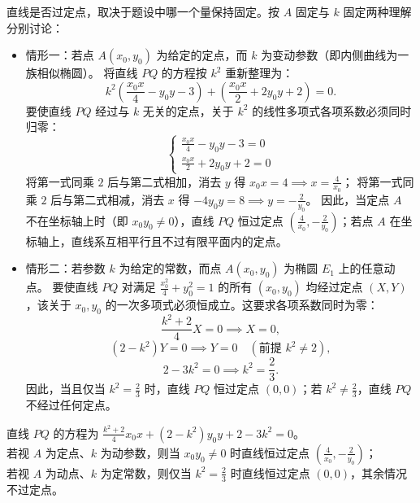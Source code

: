 \begin{solution}
直线是否过定点，取决于题设中哪一个量保持固定。按 $A$ 固定与 $k$ 固定两种理解分别讨论：
\begin{itemize}
\item 情形一：若点 $A(x_0, y_0)$ 为给定的定点，而 $k$ 为变动参数（即内侧曲线为一族相似椭圆）。
将直线 $PQ$ 的方程按 $k^2$ 重新整理为：
\[ k^2 \left(\frac{x_0 x}{4} - y_0 y - 3\right) + \left(\frac{x_0 x}{2} + 2y_0 y + 2\right) = 0. \]
要使直线 $PQ$ 经过与 $k$ 无关的定点，关于 $k^2$ 的线性多项式各项系数必须同时归零：
\[ \begin{cases} \frac{x_0 x}{4} - y_0 y - 3 = 0 \\ \frac{x_0 x}{2} + 2y_0 y + 2 = 0 \end{cases} \]
将第一式同乘 $2$ 后与第二式相加，消去 $y$ 得 $x_0 x = 4 \implies x = \frac{4}{x_0}$；
将第一式同乘 $2$ 后与第二式相减，消去 $x$ 得 $-4y_0 y = 8 \implies y = -\frac{2}{y_0}$。
因此，当定点 $A$ 不在坐标轴上时（即 $x_0 y_0 \neq 0$），直线 $PQ$ 恒过定点 $\left(\frac{4}{x_0}, -\frac{2}{y_0}\right)$；若点 $A$ 在坐标轴上，直线系互相平行且不过有限平面内的定点。
\item 情形二：若参数 $k$ 为给定的常数，而点 $A(x_0, y_0)$ 为椭圆 $E_1$ 上的任意动点。
要使直线 $PQ$ 对满足 $\frac{x_0^2}{4} + y_0^2 = 1$ 的所有 $(x_0, y_0)$ 均经过定点 $(X, Y)$，该关于 $x_0, y_0$ 的一次多项式必须恒成立。这要求各项系数同时为零：
\[ \frac{k^2 + 2}{4} X = 0 \implies X = 0, \]
\[ (2 - k^2) Y = 0 \implies Y = 0 \quad (\text{前提 } k^2 \neq 2), \]
\[ 2 - 3k^2 = 0 \implies k^2 = \frac{2}{3}. \]
因此，当且仅当 $k^2 = \frac{2}{3}$ 时，直线 $PQ$ 恒过定点 $(0,0)$；若 $k^2 \neq \frac{2}{3}$，直线 $PQ$ 不经过任何定点。
\end{itemize}
直线 $PQ$ 的方程为 $\frac{k^2 + 2}{4} x_0 x + (2 - k^2) y_0 y + 2 - 3k^2 = 0$。\\
若视 $A$ 为定点、$k$ 为动参数，则当 $x_0 y_0 \neq 0$ 时直线恒过定点 $\left(\frac{4}{x_0}, -\frac{2}{y_0}\right)$；\\
若视 $A$ 为动点、$k$ 为定常数，则仅当 $k^2 = \frac{2}{3}$ 时直线恒过定点 $(0,0)$，其余情况不过定点。
\end{solution}



